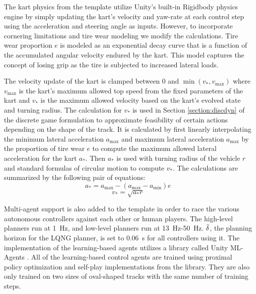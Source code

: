 The kart physics from the template utilize Unity's built-in Rigidbody physics engine by simply updating the kart's velocity and yaw-rate at each control step using the acceleration and steering angle as inputs. However, to incorporate cornering limitations and tire wear modeling we modify the calculations. Tire wear proportion $e$ is modeled as an exponential decay curve that is a function of the accumulated angular velocity endured by the kart. This model captures the concept of losing grip as the tire is subjected to increased lateral loads. 

The velocity update of the kart is clamped between 0 and $\min(v_*, v_{\text{max}})$ where $v_{\text{max}}$ is the kart's maximum allowed top speed from the fixed parameters of the kart and $v_*$ is the maximum allowed velocity based on the kart's evolved state and turning radius. The calculation for $v_*$ is used in Section \ref{section:discdyn} of the discrete game formulation to approximate feasibility of certain actions depending on the shape of the track. It is calculated by first linearly interpolating the minimum lateral acceleration $a_{\text{max}}$ and maximum lateral acceleration $a_{\text{max}}$ by the proportion of tire wear $e$ to compute the maximum allowed lateral acceleration for the kart $a_*$. Then $a_*$ is used with turning radius of the vehicle $r$ and standard formulas of circular motion to compute $v_*$. The calculations are summarized by the following pair of equations:
\begin{equation}
     a_* = a_{\text{max}} - (a_{\text{max}}-a_{\text{min}})e
\end{equation}
\begin{equation}
    v_* = \sqrt{a_*r}
\end{equation}

Multi-agent support is also added to the template in order to race the various autonomous controllers against each other or human players. The high-level planners run at \SI{1}{\hertz}, and low-level planners run at \SI{13}{\hertz}-\SI{50}{\hertz}. $\Bar{\delta}$, the planning horizon for the LQNG planner, is set to \SI{0.06}{\second} for all controllers using it. The implementation of the learning-based agents utilizes a library called Unity ML-Agents \cite{mlagents}. All of the learning-based control agents are trained using proximal policy optimization and self-play implementations from the library. They are also only trained on two sizes of oval-shaped tracks with the same number of training steps. 


